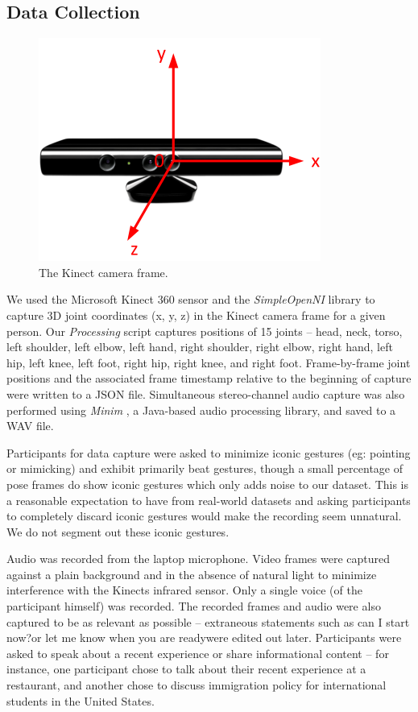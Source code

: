 \subsection{Data Collection}
\begin{figure}
\includegraphics[scale=4]{kinect.png}
\caption{The Kinect camera frame.}
\label{fig:rawframe}
\end{figure}
We used the Microsoft Kinect 360 sensor and the \textit{SimpleOpenNI} library \cite{simpleopenni} to capture 3D joint coordinates (x, y, z) in the Kinect camera frame for a given person. Our \textit{Processing} script captures positions of 15 joints -- head, neck, torso, left shoulder, left elbow, left hand, right shoulder, right elbow, right hand, left hip, left knee, left foot, right hip, right knee, and right foot. Frame-by-frame joint positions and the associated frame timestamp relative to the beginning of capture were written to a JSON file. Simultaneous stereo-channel audio capture was also performed using \textit{Minim} \cite{minimlib}, a Java-based audio processing library, and saved to a WAV file.

Participants for data capture were asked to minimize iconic gestures (eg: pointing or mimicking) and exhibit primarily beat gestures, though a small percentage of pose frames do show iconic gestures which only adds noise to our dataset. This is a reasonable expectation to have from real-world datasets and asking participants to completely discard iconic gestures would make the recording seem unnatural. We do not segment out these iconic gestures.

Audio was recorded from the laptop microphone. Video frames were captured against a plain background and in the absence of natural light to minimize interference with the Kinect\textquotesingle s infrared sensor. Only a single voice (of the participant himself) was recorded. The recorded frames and audio were also captured to be as relevant as possible -- extraneous statements such as \textquotesingle can I start now?\textquotesingle  or  \textquotesingle let me know when you are ready\textquotesingle   were edited out later. Participants were asked to speak about a recent experience or share informational content -- for instance, one participant chose to talk about their recent experience at a restaurant, and another chose to discuss immigration policy for international students in the United States.


